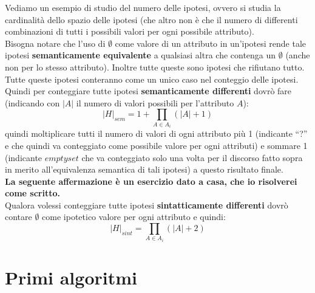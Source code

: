\documentclass[a4paper,12pt, oneside]{book}
\begin{document}
\begin{esempio}
  Vediamo un esempio di studio del numero delle ipotesi, ovvero si studia la
  cardinalità dello spazio delle ipotesi (che altro non è che il numero di
  differenti combinazioni di tutti i possibili valori per ogni possibile
  attributo).\\
  Bisogna notare che l'uso di $\emptyset$ come valore di un attributo in
  un'ipotesi rende tale ipotesi \textbf{semanticamente equivalente} a qualsiasi
  altra che contenga un $\emptyset$ (anche non per lo stesso attributo). Inoltre
  tutte queste sono ipotesi che rifiutano tutto. Tutte queste ipotesi conteranno
  come un unico caso nel conteggio delle ipotesi.\\
  Quindi per conteggiare tutte ipotesi \textbf{semanticamente differenti} dovrò
  fare (indicando con $|A|$ il numero di valori possibili per l'attributo $A$):
  \[|H|_{sem}=1+\prod_{A\in A_i} (|A|+1)\]
  quindi moltiplicare tutti il numero di valori di ogni attributo più 1
  (indicante ``?'' e che quindi va conteggiato come possibile valore per ogni
  attributi) e sommare 1 (indicante $emptyset$ che va conteggiato solo una volta
  per il discorso fatto sopra in merito all'equivalenza semantica di tali
  ipotesi) a questo risultato finale.\\
  \textbf{La seguente affermazione è un esercizio dato a casa, che io risolverei
  come scritto.}\\
  Qualora volessi conteggiare tutte ipotesi \textbf{sintatticamente differenti}
  dovrò contare $\emptyset$ come ipotetico valore per ogni attributo e quindi:
   \[|H|_{sint}=\prod_{A\in A_i} (|A|+2)\]
\end{esempio}
\section{Primi algoritmi}
\end{document}
